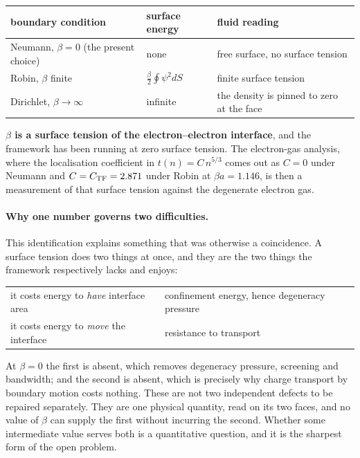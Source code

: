 \documentclass[11pt]{article}
\begin{document}
\begin{center}
\small
\begin{tabular}{@{}lll@{}}
\toprule
boundary condition & surface energy & fluid reading\\
\midrule
Neumann, $\beta=0$ (the present choice) & none & free surface, no surface tension\\
Robin, $\beta$ finite & $\tfrac{\beta}{2}\oint\psi^2dS$ & finite surface tension\\
Dirichlet, $\beta\to\infty$ & infinite & the density is pinned to zero at the face\\
\bottomrule
\end{tabular}
\end{center}

\noindent \textbf{$\beta$ is a surface tension of the electron--electron interface}, and the
framework has been running at zero surface tension. The electron-gas analysis, where the
localisation coefficient in $t(n)=C\,n^{5/3}$ comes out as $C=0$ under Neumann and
$C=C_{\rm TF}=2.871$ under Robin at $\beta a=1.146$, is then a measurement of that surface tension
against the degenerate electron gas.

\paragraph{Why one number governs two difficulties.} This identification explains something that was
otherwise a coincidence. A surface tension does two things at once, and they are the two things the
framework respectively lacks and enjoys:

\begin{center}
\small
\begin{tabular}{@{}ll@{}}
\toprule
it costs energy to \emph{have} interface area & confinement energy, hence degeneracy pressure\\
it costs energy to \emph{move} the interface & resistance to transport\\
\bottomrule
\end{tabular}
\end{center}

\noindent At $\beta=0$ the first is absent, which removes degeneracy pressure, screening and
bandwidth; and the second is absent, which is precisely why charge transport by boundary motion costs
nothing. These are not two independent defects to be repaired separately. They are one physical
quantity, read on its two faces, and no value of $\beta$ can supply the first without incurring the
second. Whether some intermediate value serves both is a quantitative question, and it is the
sharpest form of the open problem.
\end{document}
